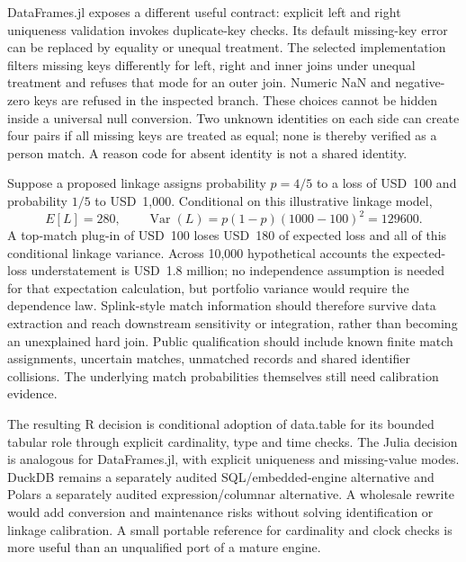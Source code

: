 DataFrames.jl exposes a different useful contract: explicit left and right uniqueness validation invokes duplicate-key checks. Its default missing-key error can be replaced by equality or unequal treatment. The selected implementation filters missing keys differently for left, right and inner joins under unequal treatment and refuses that mode for an outer join. Numeric NaN and negative-zero keys are refused in the inspected branch. These choices cannot be hidden inside a universal null conversion. Two unknown identities on each side can create four pairs if all missing keys are treated as equal; none is thereby verified as a person match. A reason code for absent identity is not a shared identity.~\citep{exec25_dww_dataframes,exec25_dww_choice}

Suppose a proposed linkage assigns probability $p=4/5$ to a loss of USD~100 and probability $1/5$ to USD~1,000. Conditional on this illustrative linkage model,
\[
 E[L]=280,\qquad
 \operatorname{Var}(L)=p(1-p)(1000-100)^2=129600.
\]
A top-match plug-in of USD~100 loses USD~180 of expected loss and all of this conditional linkage variance. Across 10,000 hypothetical accounts the expected-loss understatement is USD~1.8 million; no independence assumption is needed for that expectation calculation, but portfolio variance would require the dependence law. Splink-style match information should therefore survive data extraction and reach downstream sensitivity or integration, rather than becoming an unexplained hard join. Public qualification should include known finite match assignments, uncertain matches, unmatched records and shared identifier collisions. The underlying match probabilities themselves still need calibration evidence.~\citep{exec24_splink_sources,exec24_splink_contract,exec25_dww_choice}

The resulting R decision is conditional adoption of data.table for its bounded tabular role through explicit cardinality, type and time checks. The Julia decision is analogous for DataFrames.jl, with explicit uniqueness and missing-value modes. DuckDB remains a separately audited SQL/embedded-engine alternative and Polars a separately audited expression/columnar alternative. A wholesale rewrite would add conversion and maintenance risks without solving identification or linkage calibration. A small portable reference for cardinality and clock checks is more useful than an unqualified port of a mature engine.~\citep{exec19_duckdb_source,exec19_duckdb_reference,exec23_polars_sources,exec23_polars_reference,exec25_otm_polars,exec25_dww_choice}

